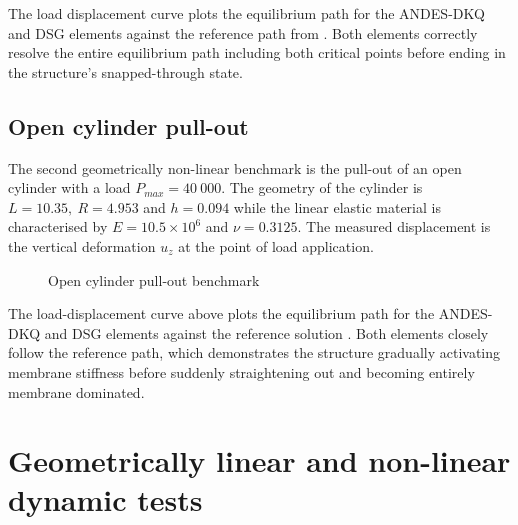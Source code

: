  
The load displacement curve plots the equilibrium path for the ANDES-DKQ and DSG elements against the reference path from \cite{Sze2004}. Both elements correctly resolve the entire equilibrium path including both critical points before ending in the structure's snapped-through state.

\newpage
\subsection{Open cylinder pull-out}

The second geometrically non-linear benchmark is the pull-out of an open cylinder with a load $P_{max} = 40\ 000$. The geometry of the cylinder is $L= 10.35,\ R = 4.953$ and $h = 0.094$ while the linear elastic material is characterised by $E = 10.5\times10^6$ and $\nu = 0.3125$. The measured displacement is the vertical deformation $u_z$ at the point of load application.

 
\begin{figure}[H]
	\caption{\label{ref_label_overall}Open cylinder pull-out benchmark}
\end{figure}

 The load-displacement curve above plots the equilibrium path for the ANDES-DKQ and DSG elements against the reference solution \cite{Sze2004}. Both elements closely follow the reference path, which demonstrates the structure gradually activating membrane stiffness before suddenly straightening out and becoming entirely membrane dominated.

\section{Geometrically linear and non-linear dynamic tests}

